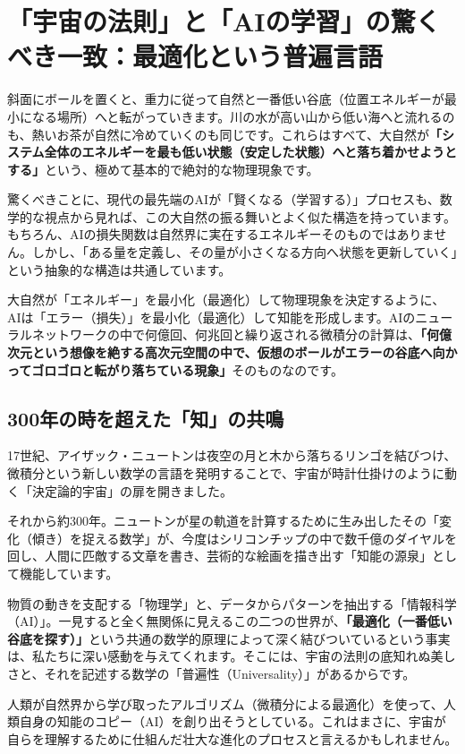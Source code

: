 \section{「宇宙の法則」と「AIの学習」の驚くべき一致：最適化という普遍言語}

斜面にボールを置くと、重力に従って自然と一番低い谷底（位置エネルギーが最小になる場所）へと転がっていきます。川の水が高い山から低い海へと流れるのも、熱いお茶が自然に冷めていくのも同じです。これらはすべて、大自然が\textbf{「システム全体のエネルギーを最も低い状態（安定した状態）へと落ち着かせようとする」}という、極めて基本的で絶対的な物理現象です。

驚くべきことに、現代の最先端のAIが「賢くなる（学習する）」プロセスも、数学的な視点から見れば、この大自然の振る舞いとよく似た構造を持っています。もちろん、AIの損失関数は自然界に実在するエネルギーそのものではありません。しかし、「ある量を定義し、その量が小さくなる方向へ状態を更新していく」という抽象的な構造は共通しています。

大自然が「エネルギー」を最小化（最適化）して物理現象を決定するように、AIは「エラー（損失）」を最小化（最適化）して知能を形成します。AIのニューラルネットワークの中で何億回、何兆回と繰り返される微積分の計算は、\textbf{「何億次元という想像を絶する高次元空間の中で、仮想のボールがエラーの谷底へ向かってゴロゴロと転がり落ちている現象」}そのものなのです。

\subsection{300年の時を超えた「知」の共鳴}

17世紀、アイザック・ニュートンは夜空の月と木から落ちるリンゴを結びつけ、微積分という新しい数学の言語を発明することで、宇宙が時計仕掛けのように動く「決定論的宇宙」の扉を開きました。

それから約300年。ニュートンが星の軌道を計算するために生み出したその「変化（傾き）を捉える数学」が、今度はシリコンチップの中で数千億のダイヤルを回し、人間に匹敵する文章を書き、芸術的な絵画を描き出す「知能の源泉」として機能しています。

物質の動きを支配する「物理学」と、データからパターンを抽出する「情報科学（AI）」。一見すると全く無関係に見えるこの二つの世界が、\textbf{「最適化（一番低い谷底を探す）」}という共通の数学的原理によって深く結びついているという事実は、私たちに深い感動を与えてくれます。そこには、宇宙の法則の底知れぬ美しさと、それを記述する数学の「普遍性（Universality）」があるからです。

人類が自然界から学び取ったアルゴリズム（微積分による最適化）を使って、人類自身の知能のコピー（AI）を創り出そうとしている。これはまさに、宇宙が自らを理解するために仕組んだ壮大な進化のプロセスと言えるかもしれません。

